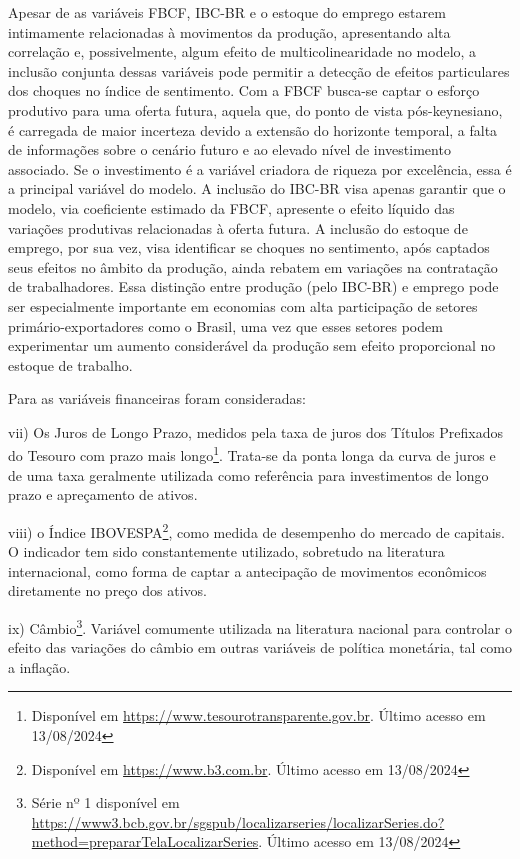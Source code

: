 Apesar de as variáveis FBCF, IBC-BR e o estoque do emprego estarem intimamente relacionadas à movimentos da produção, apresentando alta correlação e, possivelmente, algum efeito de multicolinearidade no modelo, a inclusão conjunta dessas variáveis pode permitir a detecção de efeitos particulares dos choques no índice de sentimento. Com a FBCF busca-se captar o esforço produtivo para uma oferta futura, aquela que, do ponto de vista pós-keynesiano, é carregada de maior incerteza devido a extensão do horizonte temporal, a falta de informações sobre o cenário futuro e ao elevado nível de investimento associado. Se o investimento é a variável criadora de riqueza por excelência, essa é a principal variável do modelo. A inclusão do IBC-BR visa apenas garantir que o modelo, via coeficiente estimado da FBCF, apresente o efeito líquido das variações produtivas relacionadas à oferta futura. A inclusão do estoque de emprego, por sua vez, visa identificar se choques no sentimento, após captados seus efeitos no âmbito da produção, ainda rebatem em variações na contratação de trabalhadores. Essa distinção entre produção (pelo IBC-BR) e emprego pode ser especialmente importante em economias com alta participação de setores primário-exportadores como o Brasil, uma vez que esses setores podem experimentar um aumento considerável da produção sem efeito proporcional no estoque de trabalho. 

Para as variáveis financeiras foram consideradas:

vii) Os Juros de Longo Prazo, medidos pela taxa de juros dos Títulos Prefixados do Tesouro com prazo mais longo\footnote{Disponível em \url{https://www.tesourotransparente.gov.br}.
Último acesso em 13/08/2024}. Trata-se da ponta longa da curva de juros e de uma taxa geralmente utilizada como referência para investimentos de longo prazo e apreçamento de ativos.

viii) o Índice IBOVESPA\footnote{Disponível em  \url{https://www.b3.com.br}. Último acesso em 13/08/2024}, como medida de desempenho do mercado de capitais. O indicador tem sido constantemente utilizado, sobretudo na literatura internacional, como forma de captar a antecipação de movimentos econômicos diretamente no preço dos ativos. 

ix) Câmbio\footnote{Série nº 1 disponível em \url{https://www3.bcb.gov.br/sgspub/localizarseries/localizarSeries.do?method=prepararTelaLocalizarSeries}. Último acesso em 13/08/2024}. Variável comumente utilizada na literatura nacional para controlar o efeito das variações do câmbio em outras variáveis de política monetária, tal como a inflação. 

